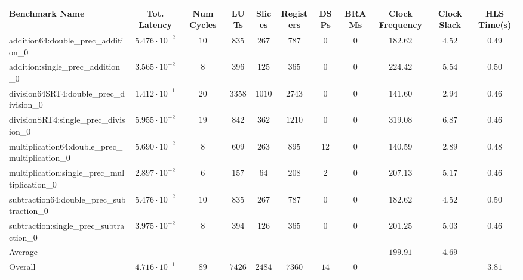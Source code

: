 \begin{tabular}{|l|c|c|c|c|c|c|c|c|c|c|}
\hline
Benchmark Name                                   & Tot. Latency            & Num Cycles & LUTs     & Slices   & Registers & DSPs   & BRAMs & Clock Frequency & Clock Slack & HLS Time(s) \\
\hline
addition64:double\_prec\_addition\_0             & $ 5.476 \cdot 10^{-2} $ & $ 10     $ & $ 835  $ & $ 267  $ & $ 787   $ & $ 0  $ & $ 0 $ & $ 182.62      $ & $ 4.52    $ & $ 0.49    $ \\
addition:single\_prec\_addition\_0               & $ 3.565 \cdot 10^{-2} $ & $ 8      $ & $ 396  $ & $ 125  $ & $ 365   $ & $ 0  $ & $ 0 $ & $ 224.42      $ & $ 5.54    $ & $ 0.50    $ \\
division64SRT4:double\_prec\_division\_0         & $ 1.412 \cdot 10^{-1} $ & $ 20     $ & $ 3358 $ & $ 1010 $ & $ 2743  $ & $ 0  $ & $ 0 $ & $ 141.60      $ & $ 2.94    $ & $ 0.46    $ \\
divisionSRT4:single\_prec\_division\_0           & $ 5.955 \cdot 10^{-2} $ & $ 19     $ & $ 842  $ & $ 362  $ & $ 1210  $ & $ 0  $ & $ 0 $ & $ 319.08      $ & $ 6.87    $ & $ 0.46    $ \\
multiplication64:double\_prec\_multiplication\_0 & $ 5.690 \cdot 10^{-2} $ & $ 8      $ & $ 609  $ & $ 263  $ & $ 895   $ & $ 12 $ & $ 0 $ & $ 140.59      $ & $ 2.89    $ & $ 0.48    $ \\
multiplication:single\_prec\_multiplication\_0   & $ 2.897 \cdot 10^{-2} $ & $ 6      $ & $ 157  $ & $ 64   $ & $ 208   $ & $ 2  $ & $ 0 $ & $ 207.13      $ & $ 5.17    $ & $ 0.46    $ \\
subtraction64:double\_prec\_subtraction\_0       & $ 5.476 \cdot 10^{-2} $ & $ 10     $ & $ 835  $ & $ 267  $ & $ 787   $ & $ 0  $ & $ 0 $ & $ 182.62      $ & $ 4.52    $ & $ 0.50    $ \\
subtraction:single\_prec\_subtraction\_0         & $ 3.975 \cdot 10^{-2} $ & $ 8      $ & $ 394  $ & $ 126  $ & $ 365   $ & $ 0  $ & $ 0 $ & $ 201.25      $ & $ 5.03    $ & $ 0.46    $ \\
\hline
Average                                          & $                     $ & $        $ & $      $ & $      $ & $       $ & $    $ & $   $ & $ 199.91      $ & $ 4.69    $ & $         $ \\
\hline
Overall                                          & $ 4.716 \cdot 10^{-1} $ & $ 89     $ & $ 7426 $ & $ 2484 $ & $ 7360  $ & $ 14 $ & $ 0 $ & $             $ & $         $ & $ 3.81    $ \\
\hline
\end{tabular}
